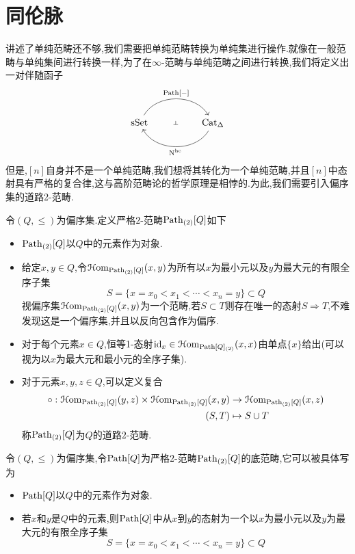 \section{同伦脉}
讲述了单纯范畴还不够,我们需要把单纯范畴转换为单纯集进行操作.就像在一般范畴与单纯集间进行转换一样,为了在$\infty$-范畴与单纯范畴之间进行转换,我们将定义出一对伴随函子
\[\begin{tikzcd}
	{\operatorname{sSet}} && {\operatorname{Cat}_{\Delta}}
	\arrow[""{name=0, anchor=center, inner sep=0}, "{\Path[-]}", bend left=60, from=1-1, to=1-3]
	\arrow[""{name=1, anchor=center, inner sep=0}, "{\nerve^{\operatorname{hc}}}", bend left=60, from=1-3, to=1-1]
	\arrow["\dashv"{anchor=center, rotate=-90}, draw=none, from=0, to=1]
\end{tikzcd}\]
但是,$[n]$自身并不是一个单纯范畴,我们想将其转化为一个单纯范畴,并且$[n]$中态射具有严格的复合律,这与高阶范畴论的哲学原理是相悖的.为此,我们需要引入偏序集的道路2-范畴.
\begin{definition}
    令$(Q,\leq)$为偏序集.定义严格$2$-范畴$\operatorname{Path}_{(2)}[Q]$如下
    \begin{itemize}
        \item $\operatorname{Path}_{(2)}[Q]$以$Q$中的元素作为对象.
        \item 给定$x,y\in Q$,令$\EuScript{H}\mathrm{om}_{\operatorname{Path}_{(2)}[Q]}(x,y)$为所有以$x$为最小元以及$y$为最大元的有限全序子集
        \[
            S = \{x = x_0<x_1<\cdots<x_n = y\}\subset Q
        \]
        视偏序集$\EuScript{H}\mathrm{om}_{\operatorname{Path}_{(2)}[Q]}(x,y)$为一个范畴,若$S\subset T$则存在唯一的态射$S \Rightarrow T$,不难发现这是一个偏序集,并且以反向包含作为偏序.
        \item 对于每个元素$x\in Q$,恒等1-态射$\mathrm{id}_x\in \EuScript{H}\mathrm{om}_{\operatorname{Path}[Q]_{(2)}}(x,x)$由单点$\{x\}$给出(可以视为以$x$为最大元和最小元的全序子集).
        \item 对于元素$x,y,z\in Q$,可以定义复合
        \begin{align*}
            \circ : \EuScript{H}\mathrm{om}_{\operatorname{Path}_{(2)}[Q]}(y,z)\times \EuScript{H}\mathrm{om}_{\operatorname{Path}_{(2)}[Q]}(x,y) &\to \EuScript{H}\mathrm{om}_{\operatorname{Path}_{(2)}[Q]}(x,z)\\
            (S,T) &\mapsto S\cup T
        \end{align*}
        称$\operatorname{Path}_{(2)}[Q]$为$Q$的道路$2$-范畴.
    \end{itemize}
\end{definition}
\begin{remark}[与道路范畴的对比]
    令$(Q,\leq)$为偏序集,令$\operatorname{Path}[Q]$为严格$2$-范畴$\operatorname{Path}_{(2)}[Q]$的底范畴,它可以被具体写为
    \begin{itemize}
        \item $\operatorname{Path}[Q]$以$Q$中的元素作为对象.
        \item 若$x$和$y$是$Q$中的元素,则$\operatorname{Path}[Q]$中从$x$到$y$的态射为一个以$x$为最小元以及$y$为最大元的有限全序子集
        \[
            S = \{x= x_0<x_1<\cdots < x_n = y\}\subset Q
        \]
    \end{itemize}
\end{remark}
